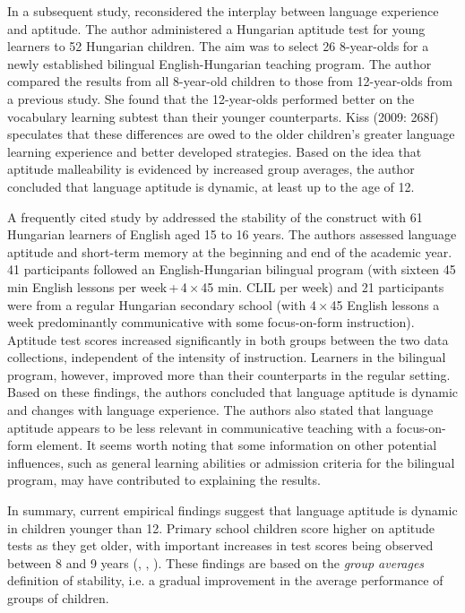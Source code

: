 \documentclass[output=paper]{langsci/langscibook}
\begin{document}
In a subsequent study, \citet{Kiss2009} reconsidered the interplay between language experience and aptitude. The author administered a Hungarian aptitude test for young learners to 52 Hungarian children. The aim was to select 26 8-year-olds for a newly established bilingual English-Hungarian teaching program. The author compared the results from all 8-year-old children to those from 12-year-olds from a previous study. She found that the 12-year-olds performed better on the vocabulary learning subtest than their younger counterparts. Kiss (2009: 268f) speculates that these differences are owed to the older children’s greater language learning experience and better developed strategies. Based on the idea that aptitude malleability is evidenced by increased group averages, the author concluded that language aptitude is dynamic, at least up to the age of 12. 

A frequently cited study by \citet{SafarKormos2008} addressed the stability of the construct with 61 Hungarian learners of English aged 15 to 16 years. The authors assessed language aptitude and short-term memory at the beginning and end of the academic year. 41 participants followed an English-Hungarian bilingual program (with sixteen 45 min English lessons per week\,+\,4\,×\,45 min. CLIL per week) and 21 participants were from a regular Hungarian secondary school (with 4\,×\,45 English lessons a week predominantly communicative with some focus-on-form instruction). Aptitude test scores increased significantly in both groups between the two data collections, independent of the intensity of instruction. Learners in the bilingual program, however, improved more than their counterparts in the regular setting. Based on these findings, the authors concluded that language aptitude is dynamic and changes with language experience. The authors also stated that language aptitude appears to be less relevant in communicative teaching with a focus-on-form element. It seems worth noting that some information on other potential influences, such as general learning abilities or admission criteria for the bilingual program, may have contributed to explaining the results. 

In summary, current empirical findings suggest that language aptitude is dynamic in children younger than 12. Primary school children score higher on aptitude tests as they get older, with important increases in test scores being observed between 8 and 9 years (\citealt{MiltonAlexiou2006}, \citealt{Kiss2009}, \citealt{SuarezMunoz2011}). These findings are based on the \textit{group averages} definition of stability, i.e. a gradual improvement in the average performance of groups of children. 
\end{document}
